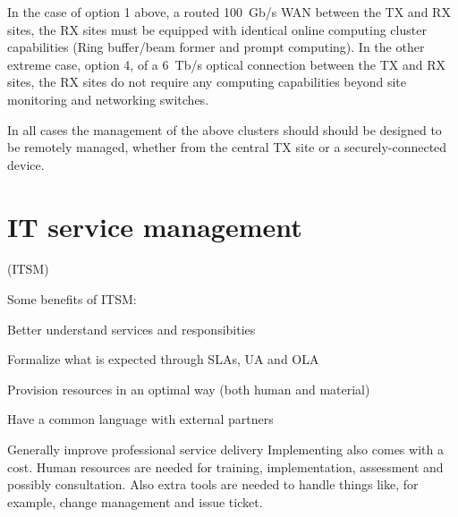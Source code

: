 \documentclass[12pt,a4paper]{article}
\begin{document}
In the case of option 1 above, a routed 100~Gb/s WAN between the TX and RX sites, the RX sites must be equipped with identical online computing cluster capabilities (Ring buffer/beam former and prompt computing).
In the other extreme case, option 4, of a 6~Tb/s optical connection between the TX and RX sites, the RX sites do not require any computing capabilities beyond site monitoring and networking switches.

In all cases the management of the above clusters should should be designed to be remotely managed, whether from the central TX site or a securely-connected device.




\section{IT service management} \label{sec:itsm}

(ITSM) %

Some benefits of ITSM:
\bitm
\item Better understand services and responsibities
\item Formalize what is expected through SLAs, UA and OLA%
\item Provision resources in an optimal way (both human and material)
\item Have a common language with external partners
\item Generally improve professional service delivery
\eitm
Implementing also comes with a cost. Human resources are needed for
training, implementation, assessment and possibly consultation. Also
extra tools are needed to handle things like, for example, change management and issue ticket.
\end{document}
